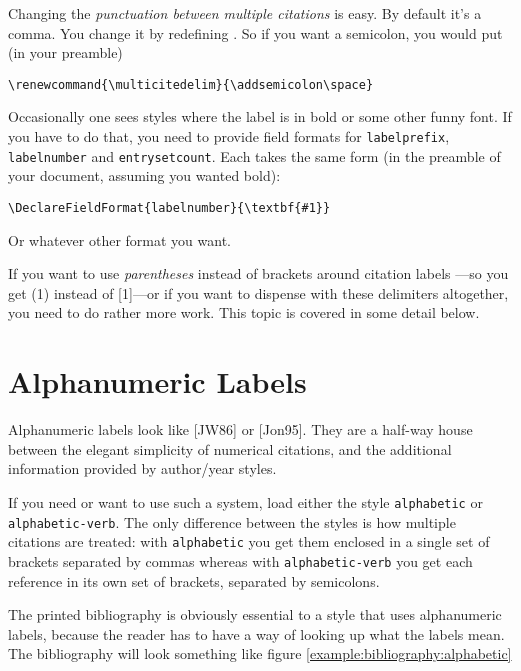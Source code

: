 Changing the \emph{punctuation between multiple citations} is
easy. By default it's a comma. You change it by redefining
. So if you want a semicolon, you would put (in
your preamble)
\begin{center}
\verb|\renewcommand{\multicitedelim}{\addsemicolon\space}|
\end{center}

Occasionally one sees styles where the label is in
bold or some other
funny font. If you have to do that, you need to provide field formats
for \verb|labelprefix|, \verb|labelnumber| and
\verb|entrysetcount|. Each takes the same form (in the preamble of
your document, assuming you wanted bold):
\begin{center}
\verb|\DeclareFieldFormat{labelnumber}{\textbf{#1}}|
\end{center}
Or whatever other format you want.


If you want to use \emph{parentheses} instead of brackets around citation labels
---so you get (1) instead of [1]---or if you want to dispense with
these delimiters altogether, you need to do rather more
work. This topic is covered in some detail below.

\section{Alphanumeric Labels}

Alphanumeric labels look like [JW86] or [Jon95]. They are a half-way house between the elegant
simplicity of numerical citations, and the additional information
provided by author/year styles.

If you need or want to use such a system, load either the style
\verb|alphabetic| or \verb|alphabetic-verb|. The only difference
between the styles is how multiple citations are treated: with
\verb|alphabetic| you get them enclosed in a single set of
brackets
separated by commas
whereas with \verb|alphabetic-verb| you get each reference in its own
set of brackets, separated by semicolons.

The printed bibliography is obviously essential to a style that uses
alphanumeric labels, because the reader has to have a way of looking
up what the labels mean. The bibliography will look something like
figure \ref{example:bibliography:alphabetic}

